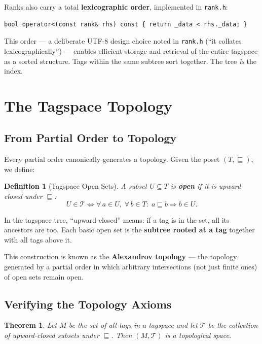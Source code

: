 \documentclass{article}
\newtheorem{definition}{Definition}[section]
\newtheorem{theorem}{Theorem}[section]
\begin{document}
Ranks also carry a total \textbf{lexicographic order}, implemented in
\texttt{rank.h}:
\begin{lstlisting}[style=cpp, caption={Lexicographic ordering of ranks}]
bool operator<(const rank& rhs) const { return _data < rhs._data; }
\end{lstlisting}

This order --- a deliberate UTF-8 design choice noted in \texttt{rank.h}
(``it collates lexicographically'') --- enables efficient storage and retrieval
of the entire tagspace as a sorted structure. Tags within the same subtree sort
together. The tree \emph{is} the index.

\section{The Tagspace Topology}

\subsection{From Partial Order to Topology}

Every partial order canonically generates a topology. Given the poset
$(T, \sqsubseteq)$, we define:

\begin{definition}[Tagspace Open Sets]
A subset $U \subseteq T$ is \textbf{open} if it is upward-closed under
$\sqsubseteq$:
\[
  U \in \mathcal{T}
  \iff
  \forall\, a \in U,\; \forall\, b \in T :\;
  a \sqsubseteq b \Rightarrow b \in U.
\]
\end{definition}

In the tagspace tree, ``upward-closed'' means: if a tag is in the set, all
its ancestors are too. Each basic open set is the \textbf{subtree rooted at a
tag} together with all tags above it.

This construction is known as the \textbf{Alexandrov topology} --- the topology
generated by a partial order in which arbitrary intersections (not just finite
ones) of open sets remain open.

\subsection{Verifying the Topology Axioms}

\begin{theorem}
Let $M$ be the set of all tags in a tagspace and let $\mathcal{T}$ be the
collection of upward-closed subsets under $\sqsubseteq$. Then
$(M, \mathcal{T})$ is a topological space.
\end{theorem}
\end{document}
